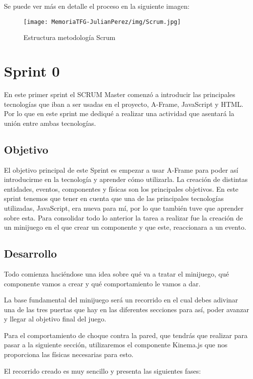 \documentclass[a4paper, 12pt]{book}
\begin{document}
Se puede ver más en detalle el proceso en la siguiente imagen:
\begin{figure}[H]
  \centering
  \texttt{[image: MemoriaTFG-JulianPerez/img/Scrum.jpg]}
  \caption{Estructura metodología Scrum}\label{scrum}
\end{figure}

\section{Sprint 0} %
\label{sec:sprint0}
En este primer sprint el SCRUM Master comenzó a introducir las principales tecnologías que iban a ser usadas en el proyecto, A-Frame, JavaScript y HTML. Por lo que en este sprint me dediqué a realizar una actividad que asentará la unión entre ambas tecnologías.

\subsection{Objetivo}
El objetivo principal de este Sprint es empezar a usar A-Frame para poder así introducirme en la tecnología y aprender cómo utilizarla. La creación de distintas entidades, eventos, componentes y físicas son los principales objetivos. En este sprint tenemos que tener en cuenta que una de las principales tecnologías utilizadas, JavaScript, era nueva para mí, por lo que también tuve que aprender sobre esta. Para consolidar todo lo anterior la tarea a realizar fue la creación de un minijuego en el que crear un componente y que este, reaccionara a un evento.

\subsection{Desarrollo}
Todo comienza haciéndose una idea sobre qué va a tratar el minijuego, qué componente vamos a crear y qué comportamiento le vamos a dar.

La base fundamental del minijuego será un recorrido en el cual debes adivinar una de las tres puertas que hay en las diferentes secciones para así, poder avanzar y llegar al objetivo final del juego.

Para el comportamiento de choque contra la pared, que tendrás que realizar para pasar a la siguiente sección, utilizaremos el componente Kinema.js que nos proporciona las físicas necesarias para esto. 

El recorrido creado es muy sencillo y presenta las siguientes fases:
\end{document}
